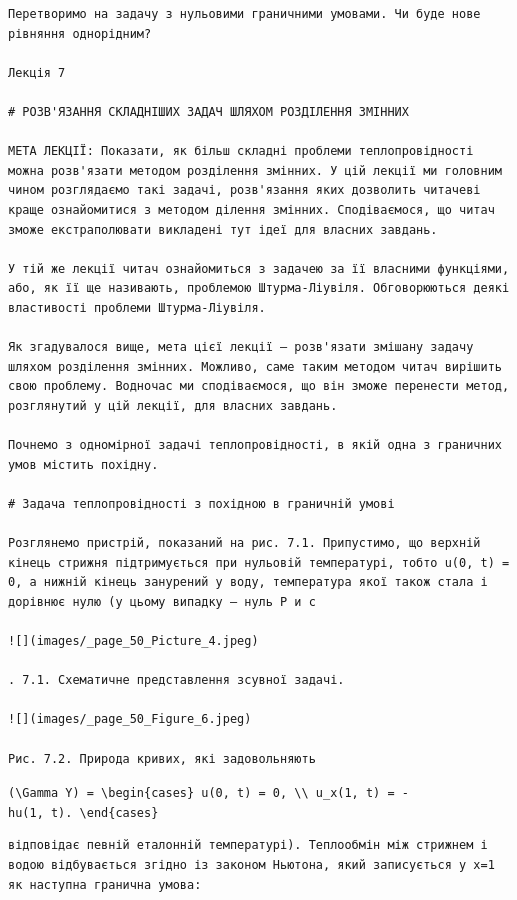 \documentclass[
  ukrainian,
]{article}
\begin{document}
\begin{verbatim}
Перетворимо на задачу з нульовими граничними умовами. Чи буде нове рівняння однорідним?

Лекція 7

# РОЗВ'ЯЗАННЯ СКЛАДНІШИХ ЗАДАЧ ШЛЯХОМ РОЗДІЛЕННЯ ЗМІННИХ

МЕТА ЛЕКЦІЇ: Показати, як більш складні проблеми теплопровідності можна розв'язати методом розділення змінних. У цій лекції ми головним чином розглядаємо такі задачі, розв'язання яких дозволить читачеві краще ознайомитися з методом ділення змінних. Сподіваємося, що читач зможе екстраполювати викладені тут ідеї для власних завдань.

У тій же лекції читач ознайомиться з задачею за її власними функціями, або, як її ще називають, проблемою Штурма-Ліувіля. Обговорюються деякі властивості проблеми Штурма-Ліувіля.

Як згадувалося вище, мета цієї лекції — розв'язати змішану задачу шляхом розділення змінних. Можливо, саме таким методом читач вирішить свою проблему. Водночас ми сподіваємося, що він зможе перенести метод, розглянутий у цій лекції, для власних завдань.

Почнемо з одномірної задачі теплопровідності, в якій одна з граничних умов містить похідну.

# Задача теплопровідності з похідною в граничній умові

Розглянемо пристрій, показаний на рис. 7.1. Припустимо, що верхній кінець стрижня підтримується при нульовій температурі, тобто u(0, t) = 0, а нижній кінець занурений у воду, температура якої також стала і дорівнює нулю (у цьому випадку — нуль Р и с

![](images/_page_50_Picture_4.jpeg)

. 7.1. Схематичне представлення зсувної задачі.

![](images/_page_50_Figure_6.jpeg)

Рис. 7.2. Природа кривих, які задовольняють
\end{verbatim}

\texttt{(\textbackslash{}Gamma\ Y)\ =\ \textbackslash{}begin\{cases\}\ u(0,\ t)\ =\ 0,\ \textbackslash{}\textbackslash{}\ u\_x(1,\ t)\ =\ -hu(1,\ t).\ \textbackslash{}end\{cases\}}

\begin{verbatim}
відповідає певній еталонній температурі). Теплообмін між стрижнем і водою відбувається згідно із законом Ньютона, який записується у x=1 як наступна гранична умова:
\end{verbatim}
\end{document}
